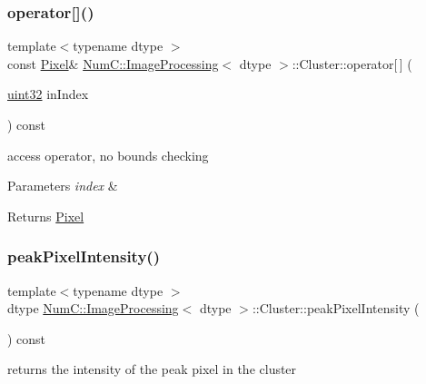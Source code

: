 \subsubsection{\texorpdfstring{operator[]()}{operator[]()}}
{\footnotesize\ttfamily template$<$typename dtype $>$ \\
const \mbox{\hyperlink{class_num_c_1_1_image_processing_1_1_pixel}{Pixel}}\& \mbox{\hyperlink{class_num_c_1_1_image_processing}{Num\+C\+::\+Image\+Processing}}$<$ dtype $>$\+::Cluster\+::operator\mbox{[}$\,$\mbox{]} (\begin{DoxyParamCaption}\item[{\mbox{\hyperlink{namespace_num_c_ae685802ca6d3035f2b400b081e3953fa}{uint32}}}]{in\+Index }\end{DoxyParamCaption}) const\hspace{0.3cm}{\ttfamily [inline]}}

access operator, no bounds checking


\begin{DoxyParams}{Parameters}
{\em index} & \\
\hline
\end{DoxyParams}
\begin{DoxyReturn}{Returns}
\mbox{\hyperlink{class_num_c_1_1_image_processing_1_1_pixel}{Pixel}} 
\end{DoxyReturn}
\mbox{\label{class_num_c_1_1_image_processing_1_1_cluster_abf91ca832195383b222b0c68b367a131}} 
\subsubsection{\texorpdfstring{peak\+Pixel\+Intensity()}{peakPixelIntensity()}}
{\footnotesize\ttfamily template$<$typename dtype $>$ \\
dtype \mbox{\hyperlink{class_num_c_1_1_image_processing}{Num\+C\+::\+Image\+Processing}}$<$ dtype $>$\+::Cluster\+::peak\+Pixel\+Intensity (\begin{DoxyParamCaption}{ }\end{DoxyParamCaption}) const\hspace{0.3cm}{\ttfamily [inline]}}

returns the intensity of the peak pixel in the cluster


